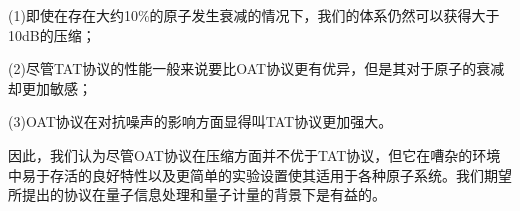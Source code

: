     (1)即使在存在大约10\%的原子发生衰减的情况下，我们的体系仍然可以获得大于10dB的压缩；

    (2)尽管TAT协议的性能一般来说要比OAT协议更有优异，但是其对于原子的衰减却更加敏感；

    (3)OAT协议在对抗噪声的影响方面显得叫TAT协议更加强大。

  因此，我们认为尽管OAT协议在压缩方面并不优于TAT协议，但它在嘈杂的环境中易于存活的良好特性以及更简单的实验设置使其适用于各种原子系统。我们期望所提出的协议在量子信息处理和量子计量的背景下是有益的。



